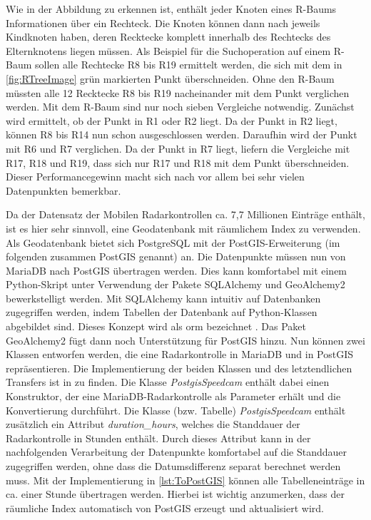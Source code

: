 Wie in der Abbildung zu erkennen ist, enthält jeder Knoten eines R-Baums Informationen über ein Rechteck.
Die Knoten können dann nach \cite{RTrees} jeweils Kindknoten haben, deren Recktecke komplett innerhalb des Rechtecks des Elternknotens liegen müssen.
Als Beispiel für die Suchoperation auf einem R-Baum sollen alle Rechtecke R8 bis R19 ermittelt werden, die sich mit dem in \autoref{fig:RTreeImage} grün markierten Punkt überschneiden.
Ohne den R-Baum müssten alle 12 Recktecke R8 bis R19 nacheinander mit dem Punkt verglichen werden.
Mit dem R-Baum sind nur noch sieben Vergleiche notwendig.
Zunächst wird ermittelt, ob der Punkt in R1 oder R2 liegt.
Da der Punkt in R2 liegt, können R8 bis R14 nun schon ausgeschlossen werden.
Daraufhin wird der Punkt mit R6 und R7 verglichen.
Da der Punkt in R7 liegt, liefern die Vergleiche mit R17, R18 und R19, dass sich nur R17 und R18 mit dem Punkt überschneiden.
Dieser Performancegewinn macht sich nach \cite{RTrees} vor allem bei sehr vielen Datenpunkten bemerkbar.

Da der Datensatz der Mobilen Radarkontrollen ca. 7,7 Millionen Einträge enthält, ist es hier sehr sinnvoll, eine Geodatenbank mit räumlichem Index zu verwenden.
Als Geodatenbank bietet sich PostgreSQL mit der PostGIS-Erweiterung (im folgenden zusammen PostGIS genannt) an.
Die Datenpunkte müssen nun von MariaDB nach PostGIS übertragen werden.
Dies kann komfortabel mit einem Python-Skript unter Verwendung der Pakete SQLAlchemy und GeoAlchemy2 bewerkstelligt werden.
Mit SQLAlchemy kann intuitiv auf Datenbanken zugegriffen werden, indem Tabellen der Datenbank auf Python-Klassen abgebildet sind.
Dieses Konzept wird als \acrfull{orm} bezeichnet \cite{SQLAlchemyKeyFeatures}.
Das Paket GeoAlchemy2 fügt dann noch Unterstützung für PostGIS hinzu.
Nun können zwei Klassen entworfen werden, die eine Radarkontrolle in MariaDB und in PostGIS repräsentieren.
Die Implementierung der beiden Klassen und des letztendlichen Transfers ist in  zu finden.
Die Klasse \emph{PostgisSpeedcam} enthält dabei einen Konstruktor, der eine MariaDB-Radarkontrolle als Parameter erhält und die Konvertierung durchführt.
Die Klasse (bzw. Tabelle) \emph{PostgisSpeedcam} enthält zusätzlich ein Attribut \emph{duration\_hours}, welches die Standdauer der Radarkontrolle in Stunden enthält.
Durch dieses Attribut kann in der nachfolgenden Verarbeitung der Datenpunkte komfortabel auf die Standdauer zugegriffen werden, ohne dass die Datumsdifferenz separat berechnet werden muss.
Mit der Implementierung in \autoref{lst:ToPostGIS} können alle Tabelleneinträge in ca. einer Stunde übertragen werden.
Hierbei ist wichtig anzumerken, dass der räumliche Index automatisch von PostGIS erzeugt und aktualisiert wird.

